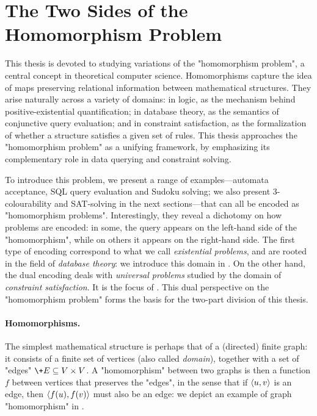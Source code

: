 \section{The Two Sides of the Homomorphism Problem}

This thesis is devoted to studying variations of the "homomorphism problem",
a central concept in theoretical computer science.
Homomorphisms capture the idea of maps preserving relational information between mathematical structures.
They arise naturally across a variety of domains: in logic, as the mechanism behind positive-existential quantification; in database theory, as the semantics of conjunctive query evaluation; and in constraint satisfaction, as the formalization of whether a structure
satisfies a given set of rules. This thesis approaches the "homomorphism problem" as a unifying framework, by emphasizing its complementary role in data querying and constraint solving.

To introduce this problem, we present a range of examples---automata acceptance, SQL query evaluation and Sudoku solving; we also present 3-colourability and SAT-solving in the next sections---that can all be encoded as "homomorphism problems".
Interestingly, they reveal a dichotomy on how problems are encoded:
in some, the query appears on the left-hand side of the "homomorphism", 
while on others it appears on the right-hand side.
The first type of encoding correspond to what we call \emph{existential problems},
and are rooted in the field of \emph{database theory}:
we introduce this domain in .
On the other hand, the dual encoding deals with \emph{universal problems}
studied by the domain of \emph{constraint satisfaction}.
It is the focus of .
This dual perspective on the "homomorphism problem"
forms the basis for the two-part division of this thesis.

\paragraph*{Homomorphisms.}
The simplest mathematical structure is perhaps that of a (directed) finite graph:
it consists of a finite set of vertices (also called \emph{domain}),
together with a set of "edges" $\+E \subseteq V \times V$.
A "homomorphism" between two graphs is then a
function $f$ between vertices that preserves
the "edges", in the sense that if $\langle u,v\rangle$ is an edge, then
$\langle f(u),f(v)\rangle$ must also be an edge: we depict
an example of graph "homomorphism" in .

